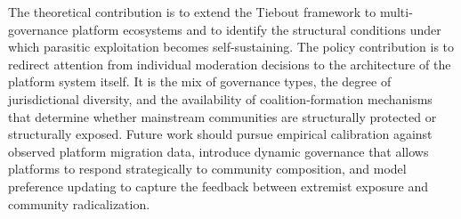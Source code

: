 The theoretical contribution is to extend the Tiebout framework to multi-governance platform ecosystems and to identify the structural conditions under which parasitic exploitation becomes self-sustaining. The policy contribution is to redirect attention from individual moderation decisions to the architecture of the platform system itself. It is the mix of governance types, the degree of jurisdictional diversity, and the availability of coalition-formation mechanisms that determine whether mainstream communities are structurally protected or structurally exposed. Future work should pursue empirical calibration against observed platform migration data, introduce dynamic governance that allows platforms to respond strategically to community composition, and model preference updating to capture the feedback between extremist exposure and community radicalization.
